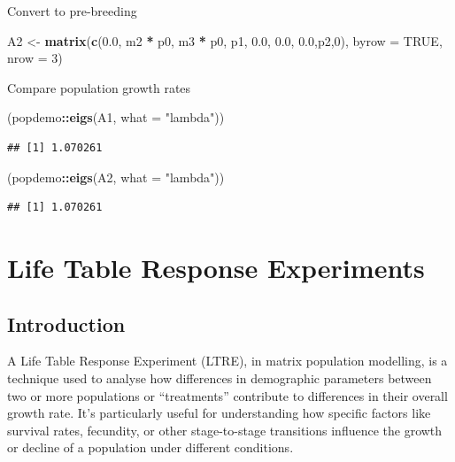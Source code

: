\documentclass[
  a4paper]{book}
\newenvironment{Shaded}{\begin{snugshade}}{\end{snugshade}}
\newcommand{\AttributeTok}[1]{\textcolor[rgb]{0.13,0.29,0.53}{#1}}
\newcommand{\ConstantTok}[1]{\textcolor[rgb]{0.56,0.35,0.01}{#1}}
\newcommand{\DecValTok}[1]{\textcolor[rgb]{0.00,0.00,0.81}{#1}}
\newcommand{\FloatTok}[1]{\textcolor[rgb]{0.00,0.00,0.81}{#1}}
\newcommand{\FunctionTok}[1]{\textcolor[rgb]{0.13,0.29,0.53}{\textbf{#1}}}
\newcommand{\NormalTok}[1]{#1}
\newcommand{\OtherTok}[1]{\textcolor[rgb]{0.56,0.35,0.01}{#1}}
\newcommand{\SpecialCharTok}[1]{\textcolor[rgb]{0.81,0.36,0.00}{\textbf{#1}}}
\newcommand{\StringTok}[1]{\textcolor[rgb]{0.31,0.60,0.02}{#1}}
\begin{document}
Convert to pre-breeding

\begin{Shaded}
\begin{Highlighting}[]
\NormalTok{A2 }\OtherTok{\textless{}{-}} \FunctionTok{matrix}\NormalTok{(}\FunctionTok{c}\NormalTok{(}\FloatTok{0.0}\NormalTok{, m2 }\SpecialCharTok{*}\NormalTok{ p0, m3 }\SpecialCharTok{*}\NormalTok{ p0,}
\NormalTok{               p1, }\FloatTok{0.0}\NormalTok{, }\FloatTok{0.0}\NormalTok{,}
               \FloatTok{0.0}\NormalTok{,p2,}\DecValTok{0}\NormalTok{), }\AttributeTok{byrow =} \ConstantTok{TRUE}\NormalTok{, }\AttributeTok{nrow =} \DecValTok{3}\NormalTok{)}
\end{Highlighting}
\end{Shaded}

Compare population growth rates

\begin{Shaded}
\begin{Highlighting}[]
\NormalTok{(popdemo}\SpecialCharTok{::}\FunctionTok{eigs}\NormalTok{(A1, }\AttributeTok{what =} \StringTok{"lambda"}\NormalTok{))}
\end{Highlighting}
\end{Shaded}

\begin{verbatim}
## [1] 1.070261
\end{verbatim}

\begin{Shaded}
\begin{Highlighting}[]
\NormalTok{(popdemo}\SpecialCharTok{::}\FunctionTok{eigs}\NormalTok{(A2, }\AttributeTok{what =} \StringTok{"lambda"}\NormalTok{))}
\end{Highlighting}
\end{Shaded}

\begin{verbatim}
## [1] 1.070261
\end{verbatim}

\chapter{Life Table Response Experiments}\label{life-table-response-experiments}

\section{Introduction}\label{introduction}

A Life Table Response Experiment (LTRE), in matrix population modelling, is a technique used to analyse how differences in demographic parameters between two or more populations or ``treatments'' contribute to differences in their overall growth rate. It's particularly useful for understanding how specific factors like survival rates, fecundity, or other stage-to-stage transitions influence the growth or decline of a population under different conditions.
\end{document}
